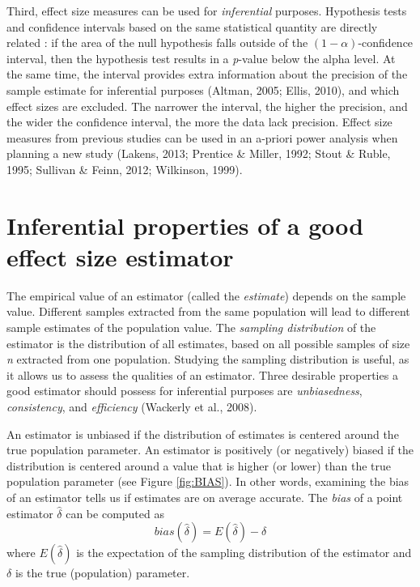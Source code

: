 \documentclass[
  english,
  man,floatsintext]{apa6}
\begin{document}
Third, effect size measures can be used for \emph{inferential} purposes. Hypothesis tests and confidence intervals based on the same statistical quantity are directly related : if the area of the null hypothesis falls outside of the \((1-\alpha)\)-confidence interval, then the hypothesis test results in a \emph{p}-value below the alpha level. At the same time, the interval provides extra information about the precision of the sample estimate for inferential purposes (Altman, 2005; Ellis, 2010), and which effect sizes are excluded. The narrower the interval, the higher the precision, and the wider the confidence interval, the more the data lack precision. Effect size measures from previous studies can be used in an a-priori power analysis when planning a new study (Lakens, 2013; Prentice \& Miller, 1992; Stout \& Ruble, 1995; Sullivan \& Feinn, 2012; Wilkinson, 1999).

\hypertarget{inferential-properties-of-a-good-effect-size-estimator}{%
\section{Inferential properties of a good effect size estimator}\label{inferential-properties-of-a-good-effect-size-estimator}}

The empirical value of an estimator (called the \emph{estimate}) depends on the sample value. Different samples extracted from the same population will lead to different sample estimates of the population value. The \emph{sampling distribution} of the estimator is the distribution of all estimates, based on all possible samples of size \emph{n} extracted from one population. Studying the sampling distribution is useful, as it allows us to assess the qualities of an estimator. Three desirable properties a good estimator should possess for inferential purposes are \emph{unbiasedness}, \emph{consistency}, and \emph{efficiency} (Wackerly et al., 2008).

An estimator is unbiased if the distribution of estimates is centered around the true population parameter. An estimator is positively (or negatively) biased if the distribution is centered around a value that is higher (or lower) than the true population parameter (see Figure \ref{fig:BIAS}). In other words, examining the bias of an estimator tells us if estimates are on average accurate. The \emph{bias} of a point estimator \(\hat{\delta}\) can be computed as
\begin{equation} 
bias(\hat{\delta})=E(\hat{\delta})-\delta
\label{eqn:BIAS}
\end{equation}
where \(E(\hat{\delta})\) is the expectation of the sampling distribution of the estimator and \(\delta\) is the true (population) parameter.
\end{document}
